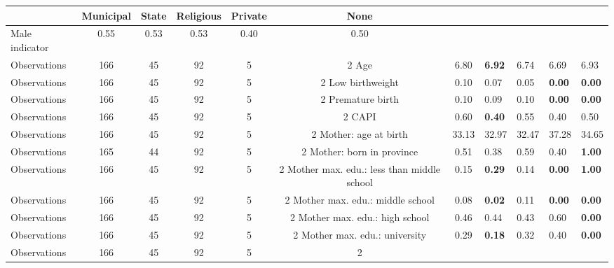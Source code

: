 \begin{tabular}{l c c c c c c }
\toprule
& \textbf{Municipal} & \textbf{State} & \textbf{Religious} & \textbf{Private} & \textbf{None} \\
\midrule
Male indicator &      0.55 &      0.53 &      0.53 &      0.40 &      0.50 \\
\midrule
Observations &       166 &        45 &        92 &         5 &         2
Age &      6.80 & \textbf{     6.92} &      6.74 &      6.69 &      6.93 \\
\midrule
Observations &       166 &        45 &        92 &         5 &         2
Low birthweight &      0.10 &      0.07 &      0.05 & \textbf{     0.00} & \textbf{     0.00} \\
\midrule
Observations &       166 &        45 &        92 &         5 &         2
Premature birth &      0.10 &      0.09 &      0.10 & \textbf{     0.00} & \textbf{     0.00} \\
\midrule
Observations &       166 &        45 &        92 &         5 &         2
CAPI &      0.60 & \textbf{     0.40} &      0.55 &      0.40 &      0.50 \\
\midrule
Observations &       166 &        45 &        92 &         5 &         2
Mother: age at birth &     33.13 &     32.97 &     32.47 &     37.28 &     34.65 \\
\midrule
Observations &       165 &        44 &        92 &         5 &         2
Mother: born in province &      0.51 &      0.38 &      0.59 &      0.40 & \textbf{     1.00} \\
\midrule
Observations &       166 &        45 &        92 &         5 &         2
Mother max. edu.: less than middle school &      0.15 & \textbf{     0.29} &      0.14 & \textbf{     0.00} & \textbf{     1.00} \\
\midrule
Observations &       166 &        45 &        92 &         5 &         2
Mother max. edu.: middle school &      0.08 & \textbf{     0.02} &      0.11 & \textbf{     0.00} & \textbf{     0.00} \\
\midrule
Observations &       166 &        45 &        92 &         5 &         2
Mother max. edu.: high school &      0.46 &      0.44 &      0.43 &      0.60 & \textbf{     0.00} \\
\midrule
Observations &       166 &        45 &        92 &         5 &         2
Mother max. edu.: university &      0.29 & \textbf{     0.18} &      0.32 &      0.40 & \textbf{     0.00} \\
\midrule
Observations &       166 &        45 &        92 &         5 &         2

\end{tabular}
